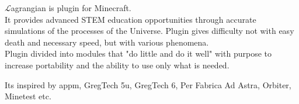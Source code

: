 \documentclass[12pt]{article}
\begin{document}
    $\mathcal{L}$agrangian is plugin for Minecraft. \\
    It provides advanced STEM education opportunities through accurate simulations of the processes of the Universe. Plugin gives difficulty not with easy death and necessary speed, but with various phenomena. \\
    Plugin divided into modules that "do little and do it well" with purpose to increase portability and the ability to use only what is needed.

    Its inspired by appm, GregTech 5u, GregTech 6, Per Fabrica Ad Astra, Orbiter, Minetest etc.
\end{document}
